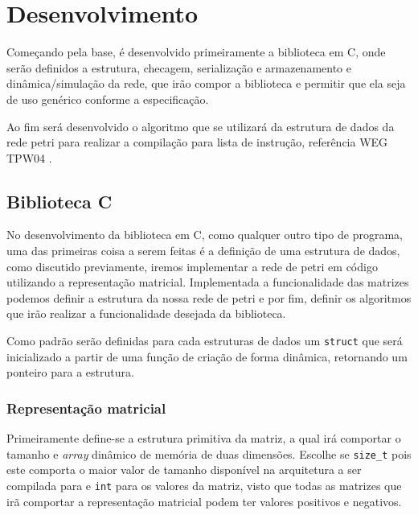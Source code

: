 \chapter{Desenvolvimento}

Começando pela base, é desenvolvido primeiramente a biblioteca em C, onde serão definidos a estrutura, checagem, serialização e armazenamento e dinâmica/simulação da rede, que irão compor a biblioteca e permitir que ela seja de uso genérico conforme a especificação. 

Ao fim será desenvolvido o algoritmo que se utilizará da estrutura de dados da rede petri para realizar a compilação para lista de instrução, referência WEG TPW04 \cite{wegtpw04}.

\section{Biblioteca C}

No desenvolvimento da biblioteca em C, como qualquer outro tipo de programa, uma das primeiras coisa a serem feitas é a definição de uma estrutura de dados, como discutido previamente, iremos implementar a rede de petri em código utilizando a representação matricial. Implementada a funcionalidade das matrizes podemos definir a estrutura da nossa rede de petri e por fim, definir os algoritmos que irão realizar a funcionalidade desejada da biblioteca.

Como padrão serão definidas para cada estruturas de dados um \lstinline{struct} que será inicializado a partir de uma função de criação de forma dinâmica, retornando um ponteiro para a estrutura.

\subsection{Representação matricial}

Primeiramente define-se a estrutura primitiva da matriz, a qual irá comportar o tamanho e \textit{array} dinâmico de memória de duas dimensões. Escolhe se \lstinline{size_t} pois este comporta o maior valor de tamanho disponível na arquitetura a ser compilada para e \lstinline{int} para os valores da matriz, visto que todas as matrizes que irã comportar a representação matricial podem ter valores positivos e negativos.



